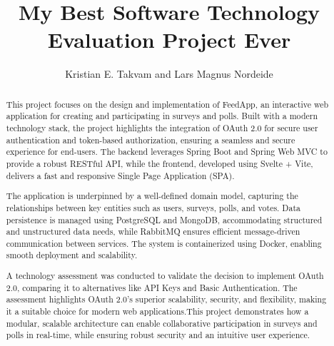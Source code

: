 \documentclass[11pt]{article}
\begin{document}
\title{My Best Software Technology Evaluation Project Ever}

\author{Kristian E. Takvam and Lars Magnus Nordeide}

\maketitle

\begin{abstract}
This project focuses on the design and implementation of FeedApp, an interactive web application for creating and participating in surveys and polls. Built with a modern technology stack, the project highlights the integration of OAuth 2.0 for secure user authentication and token-based authorization, ensuring a seamless and secure experience for end-users. The backend leverages Spring Boot and Spring Web MVC to provide a robust RESTful API, while the frontend, developed using Svelte + Vite, delivers a fast and responsive Single Page Application (SPA).

The application is underpinned by a well-defined domain model, capturing the relationships between key entities such as users, surveys, polls, and votes. Data persistence is managed using PostgreSQL and MongoDB, accommodating structured and unstructured data needs, while RabbitMQ ensures efficient message-driven communication between services. The system is containerized using Docker, enabling smooth deployment and scalability.

A technology assessment was conducted to validate the decision to implement OAuth 2.0, comparing it to alternatives like API Keys and Basic Authentication. The assessment highlights OAuth 2.0's superior scalability, security, and flexibility, making it a suitable choice for modern web applications.This project demonstrates how a modular, scalable architecture can enable collaborative participation in surveys and polls in real-time, while ensuring robust security and an intuitive user experience.

\end{abstract}

%














{}
\end{document}
